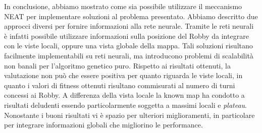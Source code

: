 In conclusione, abbiamo mostrato come sia possibile utilizzare il meccanismo NEAT
per implementare soluzioni al problema presentato. Abbiamo descritto due
approcci diversi per fornire informazioni alla rete neurale. Tramite le reti
neurali è infatti possibile utilizzare informazioni sulla posizione del Robby
da integrare con le viste locali, oppure una vista globale della mappa. Tali
soluzioni risultano facilmente implementabili su reti neurali, ma introducono
problemi di scalabilità non banali per l'algoritmo genetico puro. Rispetto ai
risultati ottenuti, la valutazione non può che essere positiva per quanto
riguarda le viste locali, in quanto i valori di fitness ottenuti risultano
commisurati al numero di turni concessi ai Robby. A differenza della vista
locale la known map ha condotto a risultati deludenti essendo particolarmente
soggetta a massimi locali e \emph{plateau}. Nonostante i buoni risultati vi è
spazio per ulteriori miglioramenti, in particolare per integrare informazioni
globali che migliorino le performance.
